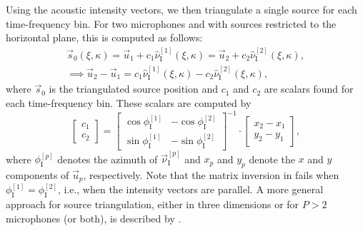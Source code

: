 Using the acoustic intensity vectors, we then triangulate a single source for each time-frequency bin.
For two microphones and with sources restricted to the horizontal plane, this is computed as follows:
\begin{equation}\label{eq:03_Navigation_Techniques:Time-Frequency_Source_Position}
\begin{gathered}
\vec{s}_0(\xi,\kappa) = \vec{u}_1 + c_1 \hat{\nu}^{[1]}_\textrm{I}(\xi,\kappa) = \vec{u}_2 + c_2 \hat{\nu}^{[2]}_\textrm{I}(\xi,\kappa),\\
\implies \vec{u}_2 - \vec{u}_1 = c_1 \hat{\nu}^{[1]}_\textrm{I}(\xi,\kappa) - c_2 \hat{\nu}^{[2]}_\textrm{I}(\xi,\kappa),
\end{gathered}
\end{equation}
where $\vec{s}_0$ is the triangulated source position and $c_1$ and $c_2$ are scalars found for each time-frequency bin.
These scalars are computed by
\begin{equation}\label{eq:03_Navigation_Techniques:Source_Triangulation}
\left[
\begin{array}{c}
c_1 \\
c_2
\end{array}
\right]
 = 
\left[
\begin{array}{cc}
\cos \phi_\textrm{I}^{[1]} & -\cos \phi_\textrm{I}^{[2]} \\[6pt]
\sin \phi_\textrm{I}^{[1]} & -\sin \phi_\textrm{I}^{[2]}
\end{array}
\right]^{-1}
 \cdot 
\left[
\begin{array}{c}
x_2 - x_1 \\
y_2 - y_1
\end{array}
\right],
\end{equation}
where $\phi_\textrm{I}^{[p]}$ denotes the azimuth of $\vec{\nu}_\textrm{I}^{[p]}$ and $x_p$ and $y_p$ denote the $x$ and $y$ components of $\vec{u}_p$, respectively.
Note that the matrix inversion in  fails when $\phi_\textrm{I}^{[1]} = \phi_\textrm{I}^{[2]}$, i.e., when the intensity vectors are parallel.
A more general approach for source triangulation, either in three dimensions or for $P > 2$ microphones (or both), is described by \citet[section IV.A]{Thiergart2013}.


